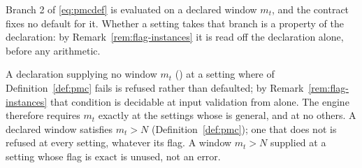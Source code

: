 
Branch 2 of \eqref{eq:pmcdef} is evaluated on a declared window $m_t$, and
the contract fixes no default for it. Whether a setting takes that branch is a
property of the declaration: by Remark~\ref{rem:flag-instances} it is
read off the declaration alone, before any arithmetic.

\begin{requirement}\label{req:window-declaration}
A declaration supplying no window $m_t$ () at a setting
where  of Definition~\ref{def:pmc} fails is refused
rather than defaulted; by Remark~\ref{rem:flag-instances} that condition is
decidable at input validation from  alone. The engine
therefore requires $m_t$ exactly at the settings whose  is
$\mathrm{general}$, and at no others. A declared window satisfies $m_t>N$ (Definition~\ref{def:pmc}); one
that does not is refused at every setting, whatever its flag. A window
$m_t>N$ supplied at a setting whose flag is $\mathrm{exact}$ is unused, not
an error.
\end{requirement}
